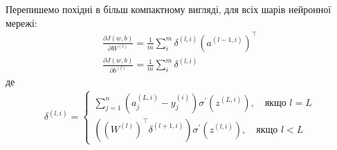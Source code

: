 \documentclass[14pt,a4paper]{extarticle}
\newcounter{e}
\numberwithin{equation}{section}
\numberwithin{figure}{section}
\newcommand{\ith}{^{(i)}}
\begin{document}
	Перепишемо похідні в більш компактному вигляді, для всіх шарів нейронної мережі:
	\begin{equation*}
		\begin{array}{l}
			\displaystyle
			\frac{\partial J(w, b)}{\partial W^{(l)}} =\frac{1}{m} \sum_{i}^{m} 	\delta^{(l, i)}\left(a^{(l-1, i)}\right)^{\top}
			\\[0.7cm]
	
			\displaystyle
			 \frac{\partial J(w, b)}{\partial b^{(l)}} =\frac{1}{m} \sum_{i}^{m} \delta^{(l, i)}
		\end{array}
	\end{equation*}
	де
	\begin{equation*}
		\begin{array}{l}
		\displaystyle
			\delta^{(l, i)}
			=
			\left\{
			\begin{array}{l}
				\displaystyle
				\sum_{j=1}^{n}{ \left(a^{(L, i)}_j - y\ith_j\right)} \sigma^{\prime}(z^{(L, i)}), \quad \text{якщо } l = L
				\\[0.7cm]
				
				\displaystyle
				\left((W^{(l)})^{\top} \delta^{(l+1, i)} \right) \sigma^{\prime} (z^{(l, i)}), \quad \text{якщо } l < L
			\end{array}\right.
		\end{array}
	\end{equation*}
\end{document}
